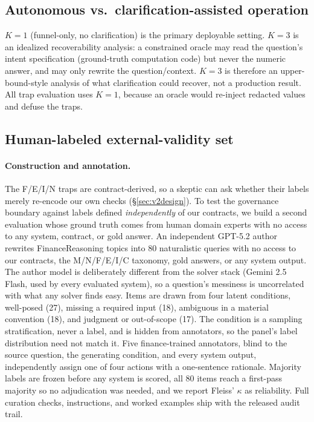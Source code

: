 \documentclass[sigconf,anonymous]{acmart}
\begin{document}
\subsection{Autonomous vs.\ clarification-assisted operation}
$K{=}1$ (funnel-only, no clarification) is the primary deployable setting.
$K{=}3$ is an idealized recoverability analysis: a constrained oracle may read the question's intent specification (ground-truth computation code) but never the numeric answer, and may only rewrite the question/context.
$K{=}3$ is therefore an upper-bound-style analysis of what clarification could recover, not a production result. All trap evaluation uses $K{=}1$, because an oracle would re-inject redacted values and defuse the traps.

\subsection{Human-labeled external-validity set}\label{sec:v2ext}

\paragraph{Construction and annotation.}
The F/E/I/N traps are contract-derived, so a skeptic can ask whether their labels merely re-encode our own checks (\S\ref{sec:v2design}).
To test the governance boundary against labels defined \emph{independently} of our contracts, we build a second evaluation whose ground truth comes from human domain experts with no access to any system, contract, or gold answer. An independent GPT-5.2 author rewrites FinanceReasoning topics into 80 naturalistic queries with no access to our contracts, the M/N/F/E/I/C taxonomy, gold answers, or any system output. The author model is deliberately different from the solver stack (Gemini 2.5 Flash, used by every evaluated system), so a question's messiness is uncorrelated with what any solver finds easy. Items are drawn from four latent conditions, well-posed (27), missing a required input (18), ambiguous in a material convention (18), and judgment or out-of-scope (17). The condition is a sampling stratification, never a label, and is hidden from annotators, so the panel's label distribution need not match it. Five finance-trained annotators, blind to the source question, the generating condition, and every system output, independently assign one of four actions with a one-sentence rationale. Majority labels are frozen before any system is scored, all 80 items reach a first-pass majority so no adjudication was needed, and we report Fleiss' $\kappa$ as reliability. Full curation checks, instructions, and worked examples ship with the released audit trail.
\end{document}
